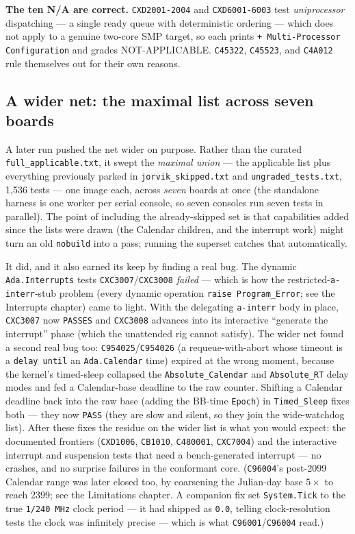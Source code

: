 \textbf{The ten N/A are correct.} \texttt{CXD2001-2004} and \texttt{CXD6001-6003} test
\emph{uniprocessor} dispatching --- a single ready queue with deterministic ordering ---
which does not apply to a genuine two-core SMP target, so each prints
\texttt{+ Multi-Processor Configuration} and grades NOT-APPLICABLE. \texttt{C45322},
\texttt{C45523}, and \texttt{C4A012} rule themselves out for their own reasons.

\subsection{A wider net: the maximal list across seven boards}

A later run pushed the net wider on purpose. Rather than the curated
\texttt{full\_applicable.txt}, it swept the \emph{maximal union} --- the applicable
list plus everything previously parked in \texttt{jorvik\_skipped.txt} and
\texttt{ungraded\_tests.txt}, 1{,}536 tests --- one image each, across \emph{seven}
boards at once (the standalone harness is one worker per serial console, so seven
consoles run seven tests in parallel). The point of including the already-skipped
set is that capabilities added since the lists were drawn (the Calendar children,
and the interrupt work) might turn an old \texttt{nobuild} into a pass; running the
superset catches that automatically.

It did, and it also earned its keep by finding a real bug. The dynamic
\texttt{Ada.Interrupts} tests \texttt{CXC3007}/\texttt{CXC3008} \emph{failed} ---
which is how the restricted-\texttt{a-interr}-stub problem (every dynamic operation
\texttt{raise Program\_Error}; see the Interrupts chapter) came to light. With the
delegating \texttt{a-interr} body in place, \texttt{CXC3007} now \texttt{PASSES} and
\texttt{CXC3008} advances into its interactive ``generate the interrupt'' phase
(which the unattended rig cannot satisfy). The wider net found a second real bug
too: \texttt{C954025}/\texttt{C954026} (a requeue-with-abort whose timeout is a
\texttt{delay until} an \texttt{Ada.Calendar} time) expired at the wrong moment,
because the kernel's timed-sleep collapsed the \texttt{Absolute\_Calendar} and
\texttt{Absolute\_RT} delay modes and fed a Calendar-base deadline to the raw
counter. Shifting a Calendar deadline back into the raw base (adding the BB-time
\texttt{Epoch}) in \texttt{Timed\_Sleep} fixes both --- they now \texttt{PASS}
(they are slow and silent, so they join the wide-watchdog list). After these
fixes the residue on the wider list is what you would expect: the documented
frontiers (\texttt{CXD1006}, \texttt{CB1010}, \texttt{C480001}, \texttt{CXC7004})
and the interactive interrupt and suspension tests that need a bench-generated
interrupt --- no crashes, and no surprise failures in the conformant core.
(\texttt{C96004}'s post-2099 Calendar range was later closed too, by coarsening the
Julian-day base $5\times$ to reach 2399; see the Limitations chapter. A companion
fix set \texttt{System.Tick} to the true \texttt{1/240\,MHz} clock period --- it had
shipped as \texttt{0.0}, telling clock-resolution tests the clock was infinitely
precise --- which is what \texttt{C96001}/\texttt{C96004} read.)

